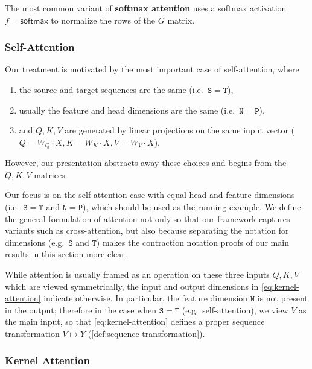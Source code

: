 The most common variant of \textbf{softmax attention} uses a softmax activation $f=\mathsf{softmax}$ to normalize the rows of the $G$ matrix.

\subsubsection{Self-Attention}
Our treatment is motivated by the most important case of self-attention, where

\begin{enumerate}[label=(\roman*)]
  \item the source and target sequences are the same (i.e.\ $\mathtt{S}=\mathtt{T}$),
  \item usually the feature and head dimensions are the same (i.e.\ $\mathtt{N}=\mathtt{P}$),
  \item and $Q, K, V$ are generated by linear projections on the same input vector ($Q = W_Q \cdot X, K = W_K \cdot X, V = W_V \cdot X$).
\end{enumerate}

However, our presentation abstracts away these choices and begins from the $Q, K, V$ matrices.

\begin{remark}
  Our focus is on the self-attention case with equal head and feature dimensions (i.e.\ $\mathtt{S}=\mathtt{T}$ and $\mathtt{N}=\mathtt{P}$),
  which should be used as the running example. We define the general formulation of attention not only so that our framework captures variants such as cross-attention, but also because separating the notation for dimensions (e.g.\ $\mathtt{S}$ and $\mathtt{T}$) makes the contraction notation proofs of our main results in this section more clear.
\end{remark}

\begin{remark}
  \label{rmk:attention-input}
  While attention is usually framed as an operation on these three inputs $Q, K, V$ which are viewed symmetrically, the input and output dimensions in \eqref{eq:kernel-attention} indicate otherwise. In particular, the feature dimension $\mathtt{N}$ is not present in the output; therefore in the case when $\mathtt{S}=\mathtt{T}$ (e.g.\ self-attention), we view $V$ as the main input, so that \eqref{eq:kernel-attention} defines a proper sequence transformation $V \mapsto Y$ (\ref{def:sequence-transformation}).
\end{remark}

\subsubsection{Kernel Attention}
\label{sec:attention:kernel}

